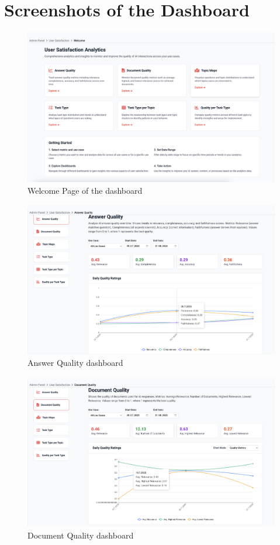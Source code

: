 \documentclass[
	english,
	ruledheaders=section,%
	class=report,%
	thesis={type=bachelor},%
	accentcolor=1b,%
	custommargins=true,%
	marginpar=false,%
	parskip=half-,%
	fontsize=11pt,%
	DIV=14,
]{tudapub}
\begin{document}
\section*{Screenshots of the Dashboard}

\begin{figure}[h!]
    \includegraphics[width=0.75\linewidth]{images/WelcomePage.png}
    \captionsetup{list=no}
    \caption{Welcome Page of the dashboard}
    \label{fig:welcome_page}
\end{figure}

\begin{figure}[h!]
    \includegraphics[width=0.75\linewidth]{images/AnswerQuality.png}
    \captionsetup{list=no}
    \caption{Answer Quality dashboard}
    \label{fig:answer_quality}
\end{figure}

\begin{figure}[h!]
    \includegraphics[width=0.75\linewidth]{images/DocumentQuality.png}
    \captionsetup{list=no}
    \caption{Document Quality dashboard}
    \label{fig:document_quality}
\end{figure}
\end{document}
